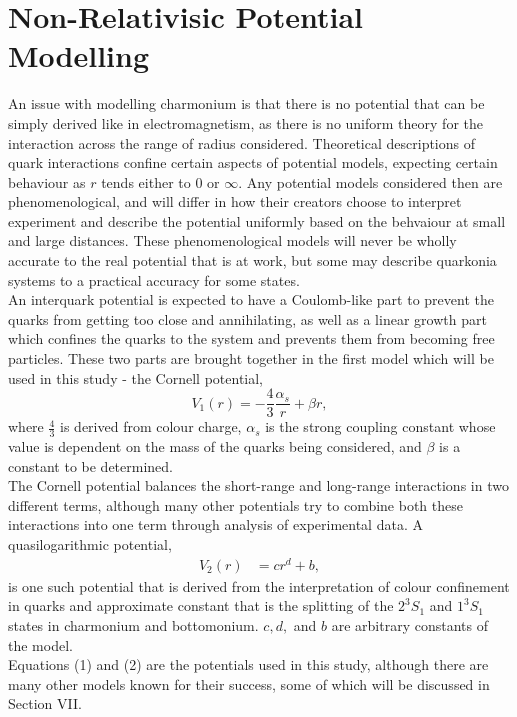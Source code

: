 \documentclass[10pt, twocolumn]{article}
\begin{document}
\section{Non-Relativisic Potential Modelling}
An issue with modelling charmonium is that there is no potential that can be simply derived like in electromagnetism, as there is no uniform theory for the interaction across the range of radius considered.
Theoretical descriptions of quark interactions confine certain aspects of potential models, expecting certain behaviour as $r$ tends either to $0$ or $\infty$.
Any potential models considered then are phenomenological, and will differ in how their creators choose to interpret experiment and describe the potential uniformly based on the behvaiour at small and large distances.
These phenomenological models will never be wholly accurate to the real potential that is at work, but some may describe quarkonia systems to a practical accuracy for some states.\\
An interquark potential is expected to have a Coulomb-like part to prevent the quarks from getting too close and annihilating, as well as a linear growth part which confines the quarks to the system and prevents them from becoming free particles.
These two parts are brought together in the first model which will be used in this study - the Cornell potential,
\begin{equation}
    V_1(r) = -\frac43\frac{\alpha_s}{r} + \beta r,
\end{equation}
where $\frac43$ is derived from colour charge, $\alpha_s$ is the strong coupling constant whose value is dependent on the mass of the quarks being considered, and $\beta$ is a constant to be determined. \\
The Cornell potential balances the short-range and long-range interactions in two different terms, although many other potentials try to combine both these interactions into one term through analysis of experimental data. 
A quasilogarithmic potential,
\begin{align}
    V_2(r) &= cr^d + b,
\end{align}
is one such potential that is derived from the interpretation of colour confinement in quarks and approximate constant that is the splitting of the $2^3S_1$ and $1^3S_1$ states in charmonium and bottomonium. 
$c,d,$ and $b$ are arbitrary constants of the model. \\
Equations (1) and (2) are the potentials used in this study, although there are many other models known for their success, some of which will be discussed in Section \RN{7}.
\end{document}
